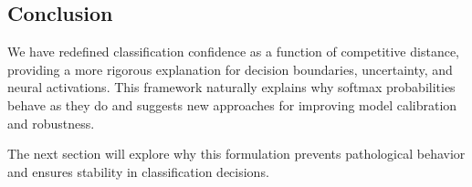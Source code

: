 \subsection{Conclusion}

We have redefined classification confidence as a function of competitive distance, providing a more rigorous explanation for decision boundaries, uncertainty, and neural activations. This framework naturally explains why softmax probabilities behave as they do and suggests new approaches for improving model calibration and robustness.

The next section will explore why this formulation prevents pathological behavior and ensures stability in classification decisions.
